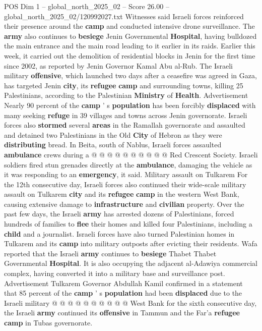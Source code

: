 \begin{textsample}{POS Dim 1 – global\_north\_2025\_02 – Score 26.00 – global\_north\_2025\_02/120992027.txt}  \label{ex:f1_pos_438}
Witnesses said Israeli forces reinforced their presence around the \textbf{camp} and conducted intensive drone surveillance.
The \textbf{army} also continues to \textbf{besiege} Jenin Governmental \textbf{Hospital}, having bulldozed the main entrance and the main road leading to it earlier in its raids.
Earlier this week, it carried out the demolition of residential blocks in Jenin for the first time since 2002, as reported by Jenin Governor Kamal Abu al-Rub.
The Israeli military \textbf{offensive}, which launched two days after a ceasefire was agreed in Gaza, has targeted Jenin \textbf{city}, its \textbf{refugee} \textbf{camp} and surrounding towns, killing 25 Palestinians, according to the Palestinian \textbf{Ministry} of \textbf{Health}.
Advertisement Nearly 90 percent of the \textbf{camp} ' s \textbf{population} has been forcibly \textbf{displaced} with many seeking \textbf{refuge} in 39 villages and towns across Jenin governorate.
Israeli forces also \textbf{stormed} several \textbf{areas} in the Ramallah governorate and assaulted and detained two Palestinians in the Old \textbf{City} of Hebron as they were \textbf{distributing} bread.
In Beita, south of Nablus, Israeli forces assaulted \textbf{ambulance} crews during a @ @ @ @ @ @ @ @ @ @ Red Crescent Society.
Israeli soldiers fired stun grenades directly at the \textbf{ambulance}, damaging the vehicle as it was responding to an \textbf{emergency}, it said.
Military assault on Tulkarem For the 12th consecutive day, Israeli forces also continued their wide-scale military assault on Tulkarem \textbf{city} and its \textbf{refugee} \textbf{camp} in the western West Bank, causing extensive damage to \textbf{infrastructure} and \textbf{civilian} property.
Over the past few days, the Israeli \textbf{army} has arrested dozens of Palestinians, forced hundreds of families to \textbf{flee} their homes and killed four Palestinians, including a \textbf{child} and a journalist.
Israeli forces have also turned Palestinian homes in Tulkarem and its \textbf{camp} into military outposts after evicting their residents.
Wafa reported that the Israeli \textbf{army} continues to \textbf{besiege} Thabet Thabet Governmental \textbf{Hospital}.
It is also occupying the adjacent al-Adawiya commercial complex, having converted it into a military base and surveillance post.
Advertisement Tulkarem Governor Abdullah Kamil confirmed in a statement that 85 percent of the \textbf{camp} ' s \textbf{population} had been \textbf{displaced} due to the Israeli military @ @ @ @ @ @ @ @ @ @ West Bank for the sixth consecutive day, the Israeli \textbf{army} continued its \textbf{offensive} in Tammun and the Far'a \textbf{refugee} \textbf{camp} in Tubas governorate.

\end{textsample}
